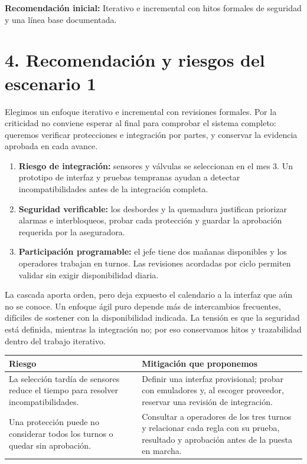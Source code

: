 \documentclass[10pt,letterpaper]{article}
\newcommand{\titulo}[1]{\section*{\textcolor{verde}{#1}}}
\begin{document}
\par
\normalsize
\par
\textbf{Recomendación inicial:} Iterativo e incremental con hitos formales de seguridad y una línea base documentada.
\par
\titulo{4. Recomendación y riesgos del escenario 1}
\par
Elegimos un enfoque iterativo e incremental con revisiones formales. Por la criticidad no conviene esperar al final para comprobar el sistema completo: queremos verificar protecciones e integración por partes, y conservar la evidencia aprobada en cada avance.
\par
\begin{enumerate}[leftmargin=*,itemsep=1pt]
\item \textbf{Riesgo de integración:} sensores y válvulas se seleccionan en el mes 3. Un prototipo de interfaz y pruebas tempranas ayudan a detectar incompatibilidades antes de la integración completa.
\item \textbf{Seguridad verificable:} los desbordes y la quemadura justifican priorizar alarmas e interbloqueos, probar cada protección y guardar la aprobación requerida por la aseguradora.
\item \textbf{Participación programable:} el jefe tiene dos mañanas disponibles y los operadores trabajan en turnos. Las revisiones acordadas por ciclo permiten validar sin exigir disponibilidad diaria.
\end{enumerate}
\par
La cascada aporta orden, pero deja expuesto el calendario a la interfaz que aún no se conoce. Un enfoque ágil puro depende más de intercambios frecuentes, difíciles de sostener con la disponibilidad indicada. La tensión es que la seguridad está definida, mientras la integración no; por eso conservamos hitos y trazabilidad dentro del trabajo iterativo.
\par
\begin{tabularx}{\linewidth}{@{}p{6cm}Y@{}}
\color{white}\textbf{Riesgo}&\color{white}\textbf{Mitigación que proponemos}\\\midrule
La selección tardía de sensores reduce el tiempo para resolver incompatibilidades.&Definir una interfaz provisional; probar con emuladores y, al escoger proveedor, reservar una revisión de integración.\\
Una protección puede no considerar todos los turnos o quedar sin aprobación.&Consultar a operadores de los tres turnos y relacionar cada regla con su prueba, resultado y aprobación antes de la puesta en marcha.\\
\end{tabularx}
\end{document}
